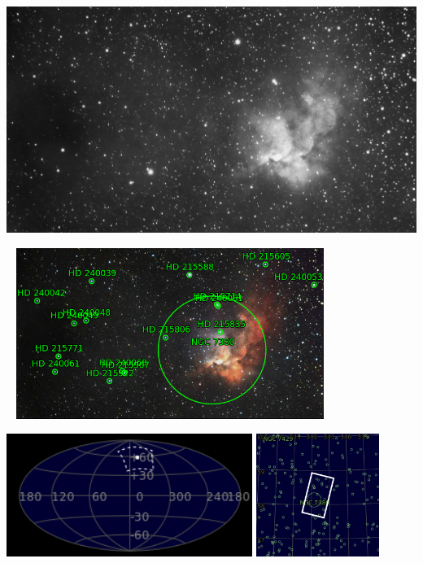 {\footnotesize\color{white}


}\ \\
\includegraphics[width=\textwidth]{../Imaging//Grayscale/Wizard_Nebula.jpg}
\begin{center}
 \ \newpage
\includegraphics[width=0.75\textwidth]{../Imaging//Annotated/Wizard_Nebula_Annotated.jpg}

\includegraphics[height=4cm]{../Imaging//Annotated/Wizard_Nebula_Close.jpg}
\includegraphics[height=4cm]{../Imaging//Annotated/Wizard_Nebula_Closer.jpg}
\end{center}

